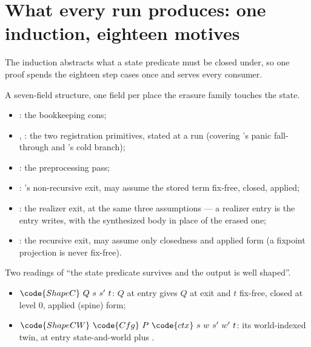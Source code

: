 \section{What every run produces: one induction, eighteen motives}
\label{sec:coldstart:induction}

The induction abstracts what a state predicate must be closed under, so one proof spends the eighteen
step cases once and serves every consumer.

\begin{definition}
\label{def:RunClosed}
\leanok
{}
 A seven-field  structure, one field per place the erasure family touches the
state.
\begin{itemize}
\item {}: the  bookkeeping cons;
\item {}, : the two registration primitives, stated at a run (covering
's panic fall-through and 's cold branch);
\item {}: the preprocessing pass;
\item {}: 's non-recursive exit, may assume the stored term fix-free, closed,
applied;
\item {}: the realizer exit, at the same three assumptions --- a realizer entry is the entry
 writes, with the synthesized body in place of the erased one;
\item {}: the recursive exit, may assume only closedness and applied form (a fixpoint projection
is never fix-free).
\end{itemize}
\end{definition}
\begin{definition}
\label{def:ShapeCW}
\leanok
{}
 Two readings of ``the state predicate survives and the output is well shaped''.
\begin{itemize}
\item $\code{ShapeC}\ Q\ s\ s'\ t$: $Q$ at entry gives $Q$ at exit and $t$ fix-free, closed at level
$0$, applied (spine) form;
\item $\code{ShapeCW}\ \code{Cfg}\ P\ \code{ctx}\ s\ w\ s'\ w'\ t$: its world-indexed twin, at entry
state-and-world plus .
\end{itemize}
\end{definition}
